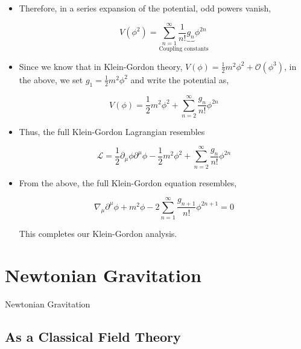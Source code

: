 \documentclass{beamer}
\begin{document}
\begin{frame}
\begin{itemize}
\item Therefore, in a series expansion of the potential, odd powers vanish,

$$V \left( \phi^2 \right) = \underset{\text{Coupling constants}}{\sum_{n=1}^\infty \frac{1}{n!} \underbrace{g_n} \phi^{2n}}$$

\item Since we know that in Klein-Gordon theory, $V \left( \phi \right) = \frac{1}{2} m^2 \phi^2 + \mathcal{O} \left( \phi^3 \right)$, in the above, we set $g_1 = \frac{1}{2} m^2 \phi^2$ and write the potential as,

$$V \left( \phi \right) = \frac{1}{2} m^2 \phi^2 + \sum_{n=2}^\infty \frac{g_n}{n!} \phi^{2n}$$
\end{itemize}
\end{frame}

\begin{frame}
\begin{itemize}
\item Thus, the full Klein-Gordon Lagrangian resembles

$$\boxed{\mathcal{L} = \frac{1}{2} \partial_\mu \phi \partial^\mu \phi - \frac{1}{2} m^2 \phi^2 + \sum_{n=2}^\infty \frac{g_n}{n!} \phi^{2n}}$$

\item From the above, the full Klein-Gordon equation resembles,

$$\boxed{\nabla_\mu \partial^\mu \phi + m^2 \phi - 2 \sum_{n=1}^\infty \frac{g_{n+1}}{n!} \phi^{2n+1} = 0}$$

This completes our Klein-Gordon analysis.
\end{itemize}
\end{frame}

\section{Newtonian Gravitation}

\begin{frame}
\begin{center}
\Huge \textcolor{blue!50!gray}{Newtonian Gravitation}
\end{center}
\end{frame}

\subsection{As a Classical Field Theory}
\end{document}
